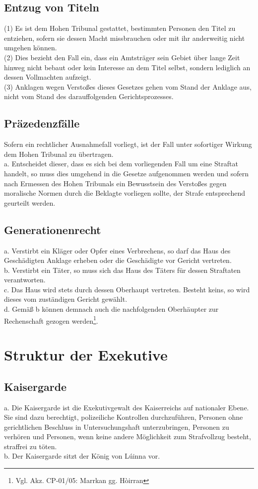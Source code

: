 \documentclass{article}
\begin{document}
\subsection{Entzug von Titeln}
(1) Es ist dem Hohen Tribunal gestattet, bestimmten Personen den Titel zu entziehen, sofern sie dessen Macht missbrauchen oder mit ihr anderweitig nicht umgehen können.\\
(2) Dies bezieht den Fall ein, dass ein Amtsträger sein Gebiet über lange Zeit hinweg nicht bebaut oder kein Interesse an dem Titel selbst, sondern lediglich an dessen Vollmachten aufzeigt.\\
(3) Anklagen wegen Verstoßes dieses Gesetzes gehen vom Stand der Anklage aus, nicht vom Stand des darauffolgenden Gerichtsprozesses.

\subsection{Präzedenzfälle} \label{praez}
Sofern ein rechtlicher Ausnahmefall vorliegt, ist der Fall unter sofortiger Wirkung dem Hohen Tribunal zu übertragen.\\
a. Entscheidet dieser, dass es sich bei dem vorliegenden Fall um eine Straftat handelt, so muss dies umgehend in die Gesetze aufgenommen werden und
sofern nach Ermessen des Hohen Tribunals ein Bewusstsein des Verstoßes gegen moralische Normen durch die Beklagte vorliegen sollte, der Strafe entsprechend
geurteilt werden.

\subsection{Generationenrecht}
a. Verstirbt ein Kläger oder Opfer eines Verbrechens, so darf das Haus des Geschädigten Anklage erheben oder die Geschädigte vor Gericht vertreten.\\
b. Verstirbt ein Täter, so muss sich das Haus des Täters für dessen Straftaten verantworten.\\
c. Das Haus wird stets durch dessen Oberhaupt vertreten. Besteht keins, so wird dieses vom zuständigen Gericht gewählt.\\
d. Gemäß b können demnach auch die nachfolgenden Oberhäupter zur Rechenschaft gezogen werden\footnote{Vgl. Akz. CP-01/05: Marrkan gg. Hòirran}.

\section{Struktur der Exekutive}
\subsection{Kaisergarde}
a.	Die Kaisergarde ist die Exekutivgewalt des Kaiserreichs auf nationaler Ebene. Sie sind dazu berechtigt, polizeiliche Kontrollen durchzuführen, Personen ohne gerichtlichen Beschluss in Untersuchungshaft unterzubringen, Personen zu verhören und Personen, wenn keine andere Möglichkeit zum Strafvollzug besteht, straffrei zu töten.\\
b.	Der Kaisergarde sitzt der König von Lúinna vor.
\end{document}
